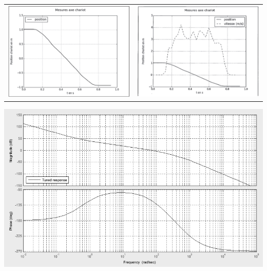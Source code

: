 \documentclass[10pt,fleqn]{article} %
\begin{document}
\begin{center}
\begin{tabular}{cc}
\includegraphics[width=7cm]{images/image13} &
\includegraphics[width=7cm]{images/image14}

\end{tabular}
\end{center}

 \begin{center}
\includegraphics[width=\textwidth]{images/image12}
\end{center} 
\fi
\end{document}
